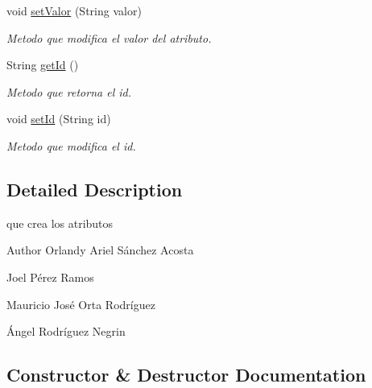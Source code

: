 \begin{DoxyCompactItemize}
void \mbox{\hyperlink{classull_1_1herramientas_1_1opendatachartgenerator_1_1_atributo_aed419fb7b2986d23375c1f84f82d05b1}{set\+Valor}} (String valor)
\begin{DoxyCompactList}\small\item\em Metodo que modifica el valor del atributo. \end{DoxyCompactList}\item 
String \mbox{\hyperlink{classull_1_1herramientas_1_1opendatachartgenerator_1_1_atributo_a063405a9e9d166a342983876cf239d07}{get\+Id}} ()
\begin{DoxyCompactList}\small\item\em Metodo que retorna el id. \end{DoxyCompactList}\item 
void \mbox{\hyperlink{classull_1_1herramientas_1_1opendatachartgenerator_1_1_atributo_af96fc3bf2e7f057d37eadbb72c9f0520}{set\+Id}} (String id)
\begin{DoxyCompactList}\small\item\em Metodo que modifica el id. \end{DoxyCompactList}\end{DoxyCompactItemize}


\subsection{Detailed Description}
que crea los atributos

\begin{DoxyAuthor}{Author}
Orlandy Ariel Sánchez Acosta 

Joel Pérez Ramos 

Mauricio José Orta Rodríguez 

Ángel Rodríguez Negrin 
\end{DoxyAuthor}


\subsection{Constructor \& Destructor Documentation}
\mbox{\label{classull_1_1herramientas_1_1opendatachartgenerator_1_1_atributo_ae0119f87842fa00c5d2c4b6ba6fb8346}} 
